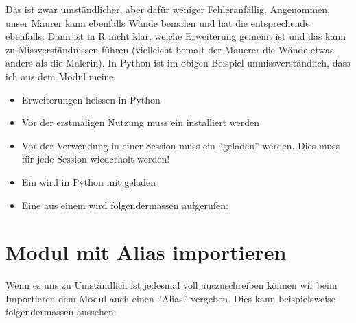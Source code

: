 \documentclass[letterpaper,10pt,english]{sphinxmanual}
\begin{document}
Das ist zwar umständlicher, aber dafür weniger Fehleranfällig. Angenommen, unser Maurer kann ebenfalls Wände bemalen und hat die entsprechende   ebenfalls. Dann ist in R nicht klar, welche Erweiterung gemeint ist und das kann zu Missverständnissen führen (vielleicht bemalt der Mauerer die Wände etwas anders als die Malerin). In Python ist im obigen Beispiel unmissverständlich, dass ich  aus dem Modul  meine.

\begin{itemize}
\item {} 
Erweiterungen heissen in Python 

\item {} 
Vor der erstmaligen Nutzung muss ein  installiert werden

\item {} 
Vor der Verwendung in einer Session muss ein  “geladen” werden. Dies muss für jede Session wiederholt werden!

\item {} 
Ein  wird in Python mit  geladen

\item {} 
Eine  aus einem  wird folgendermassen aufgerufen: 

\end{itemize}


\section{Modul mit Alias importieren}
\label{\detokenize{01_03_Python_Module:modul-mit-alias-importieren}}
Wenn es uns zu Umständlich ist jedesmal  voll auszuschreiben können wir beim Importieren dem Modul auch einen “Alias” vergeben. Dies kann beispielsweise folgendermassen aussehen:

\begin{sphinxVerbatim}[commandchars=\\\{\}]
   
\end{sphinxVerbatim}
\end{document}

